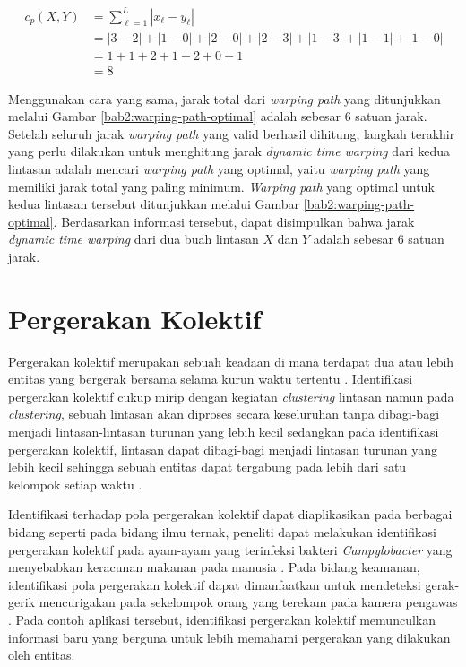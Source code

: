 \vspace{-7.5pt}

\begin{align*}
    c_p(X, Y) & = \sum_{\ell = 1}^{L} |x_\ell - y_\ell| \\
    & = |3 - 2| + |1 - 0| + |2 - 0| + |2 - 3| + |1 - 3| + |1 - 1| + |1 - 0| \\
    & = 1 + 1 + 2 + 1 + 2 + 0 + 1 \\
    & = 8
\end{align*}

Menggunakan cara yang sama, jarak total dari \textit{warping path} yang ditunjukkan melalui Gambar \ref{bab2:warping-path-optimal} adalah sebesar $6$ satuan jarak. Setelah seluruh jarak \textit{warping path} yang valid berhasil dihitung, langkah terakhir yang perlu dilakukan untuk menghitung jarak \textit{dynamic time warping} dari kedua lintasan adalah mencari \textit{warping path} yang optimal, yaitu \textit{warping path} yang memiliki jarak total yang paling minimum. \textit{Warping path} yang optimal untuk kedua lintasan tersebut ditunjukkan melalui Gambar \ref{bab2:warping-path-optimal}. Berdasarkan informasi tersebut, dapat disimpulkan bahwa jarak \textit{dynamic time warping} dari dua buah lintasan $X$ dan $Y$ adalah sebesar $6$ satuan jarak.

\iffalse 

\lionov{harus ditambah contoh perhitungan}

\fi

\section{Pergerakan Kolektif}
\label{sec:collective-movement}

Pergerakan kolektif merupakan sebuah keadaan di mana terdapat dua atau lebih entitas yang bergerak bersama selama kurun waktu tertentu \cite{wiratma:trajectory}. Identifikasi pergerakan kolektif cukup mirip dengan kegiatan \textit{clustering} lintasan namun pada \textit{clustering}, sebuah lintasan akan diproses secara keseluruhan tanpa dibagi-bagi menjadi lintasan-lintasan turunan yang lebih kecil sedangkan pada identifikasi pergerakan kolektif, lintasan dapat dibagi-bagi menjadi lintasan turunan yang lebih kecil sehingga sebuah entitas dapat tergabung pada lebih dari satu kelompok setiap waktu \cite{wiratma:trajectory}.

Identifikasi terhadap pola pergerakan kolektif dapat diaplikasikan pada berbagai bidang seperti pada bidang ilmu ternak, peneliti dapat melakukan identifikasi pergerakan kolektif pada ayam-ayam yang terinfeksi bakteri \textit{Campylobacter} yang menyebabkan keracunan makanan pada manusia \cite{colles:02:chicken}. Pada bidang keamanan, identifikasi pola pergerakan kolektif dapat dimanfaatkan untuk mendeteksi gerak-gerik mencurigakan pada sekelompok orang yang terekam pada kamera pengawas \cite{makris:01:security}. Pada contoh aplikasi tersebut, identifikasi pergerakan kolektif memunculkan informasi baru yang berguna untuk lebih memahami pergerakan yang dilakukan oleh entitas.

